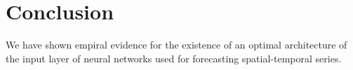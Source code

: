 \documentclass[journal]{IEEEtran}
\begin{document}




\section{Conclusion}
We have shown empiral evidence for the existence of an optimal architecture of the input layer of neural networks used for forecasting
spatial-temporal series.






%


\end{document}
